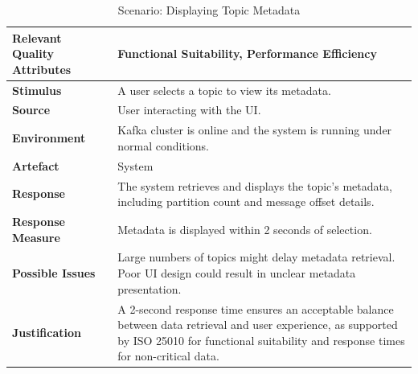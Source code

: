 \documentclass[10pt , a4paper]{report}
\begin{document}
\begin{small}
\begin{table}[h!tbp]
\centering
\renewcommand{\arraystretch}{1.3} %
\begin{tabular}{|l|p{9cm}|}
\hline
\textbf{Relevant Quality Attributes} & Functional Suitability, Performance Efficiency \\ \hline
\textbf{Stimulus} & A user selects a topic to view its metadata. \\ \hline
\textbf{Source} & User interacting with the UI. \\ \hline
\textbf{Environment} & Kafka cluster is online and the system is running under normal conditions. \\ \hline
\textbf{Artefact} & System \\ \hline
\textbf{Response} & The system retrieves and displays the topic’s metadata, including partition count and message offset details. \\ \hline
\textbf{Response Measure} & Metadata is displayed within 2 seconds of selection. \\ \hline
\textbf{Possible Issues} & Large numbers of topics might delay metadata retrieval. Poor UI design could result in unclear metadata presentation. \\ \hline
\textbf{Justification} & A 2-second response time ensures an acceptable balance between data retrieval and user experience, as supported by ISO 25010 for functional suitability and response times for non-critical data. \\ \hline
\end{tabular}
\caption{Scenario: Displaying Topic Metadata}
\end{table}


\end{small}
\end{document}
